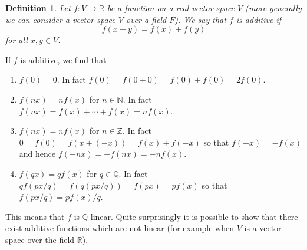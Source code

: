 \documentclass[12pt]{article}
\newcommand{\R}{\mathbb R}
\newcommand{\N}{\mathbb N}
\newcommand{\Z}{\mathbb Z}
\newcommand{\Q}{\mathbb Q}
\newtheorem{definition}{Definition}
\theoremstyle{remark}
\begin{document}
\begin{definition}
Let $f\colon V\to \R$ be a function on a real vector space $V$ (more generally we can consider a vector space $V$ over a field $F$). 
We say that $f$ is \emph{additive} if 
\[
  f(x+y)= f(x) + f(y)
\]
for all $x,y \in V$.
\end{definition}

If $f$ is additive, we find that 
\begin{enumerate}
\item
$f(0)=0$. In fact $f(0)=f(0+0)=f(0)+f(0)=2f(0)$.

\item
$f(nx) = nf(x)$ for $n\in \N$. In fact $f(nx)=f(x)+\cdots +f(x) = nf(x)$.

\item
$f(nx) = nf(x)$ for $n\in \Z$. In fact $0=f(0)=f(x+(-x)) =f(x)+f(-x)$ so that $f(-x)=-f(x)$ and hence $f(-nx)=-f(nx)=-nf(x)$.

\item
$f(qx) = q f(x)$ for $q\in \Q$. In fact $q f(px/q) = f(q(px/q))=f(px) = p f(x)$ so that $f(px/q) = pf(x)/q$.
\end{enumerate}

This means that $f$ is $\Q$ linear. 
Quite surprisingly it is possible to show that there exist additive functions which are not linear (for example when $V$ is a vector space over the field $\R$).

\end{document}
